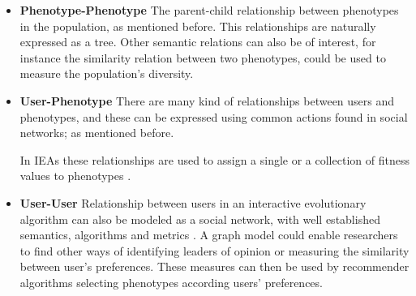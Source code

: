 \documentclass[conference]{IEEEtran}
\begin{document}
\begin{itemize}

  \item {\bf Phenotype-Phenotype} The parent-child relationship between phenotypes in the
  population, as mentioned before.  
  This relationships are naturally expressed as a tree.
  Other semantic relations can also be
  of interest, 
  for instance the similarity relation between two phenotypes, could be used to measure
  the population's diversity.   %
                                


  \item {\bf User-Phenotype} There are many kind of relationships
    between users and phenotypes, and these can be
  expressed using common actions found in social networks;
  as mentioned before.
    
  In IEAs these
  relationships are used to assign a single or a collection of
  fitness values to phenotypes \cite{garcia2013evospace}.   %

  \item {\bf User-User}
  Relationship between users in an interactive evolutionary algorithm can also be modeled 
  as a social network, with well established semantics, algorithms and metrics \cite{ahuja1993network}.
  A graph model could enable researchers to find other ways of identifying leaders of 
  opinion or measuring the similarity between user's preferences. 
  These measures can then be used by recommender algorithms selecting 
  phenotypes according users' preferences. 

\end{itemize}
\end{document}

